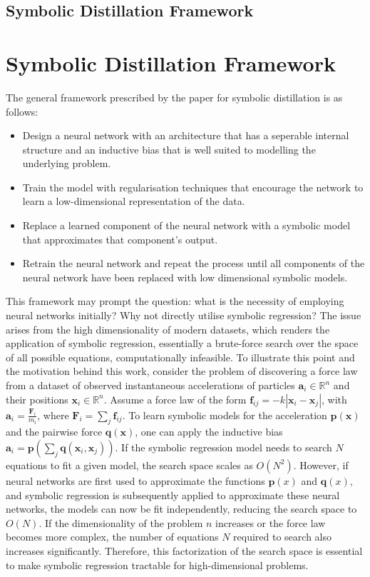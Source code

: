 \documentclass[11pt]{article}
\begin{document}
\subsection{Symbolic Distillation Framework}
\section{Symbolic Distillation Framework}
The general framework prescribed by the paper for symbolic distillation is as follows:
\begin{itemize}
    \item Design a neural network with an architecture that has a seperable internal structure and an inductive bias that is well suited to modelling the underlying problem.
    \item Train the model with regularisation techniques that encourage the network to learn a low-dimensional representation of the data.
    \item Replace a learned component of the neural network with a symbolic model that approximates that component's output.
    \item Retrain the neural network and repeat the process until all components of the neural network have been replaced with low dimensional symbolic models.
\end{itemize}

This framework may prompt the question: what is the necessity of employing neural networks initially? Why not directly utilise symbolic regression? The issue arises from the high dimensionality of modern datasets, which renders the application of symbolic regression, essentially a brute-force search over the space of all possible equations, computationally infeasible. To illustrate this point and the motivation behind this work, consider the problem of discovering a force law from a dataset of observed instantaneous accelerations of particles $\mathbf{a}_i \in \mathbb{R}^n$ and their positions $\mathbf{x}_i \in \mathbb{R}^n$. Assume a force law of the form $\mathbf{f}_{ij} = -k |\mathbf{x}_i - \mathbf{x}_j|$, with $\mathbf{a}_i = \frac{\mathbf{F}_i}{m_i}$, where $\mathbf{F}_i = \sum_j \mathbf{f}_{ij}$. To learn symbolic models for the acceleration $\textbf{p}(\textbf{x})$ and the pairwise force $\textbf{q}(\textbf{x})$, one can apply the inductive bias $\textbf{a}_i = \textbf{p}(\sum_j \textbf{q}(\textbf{x}_i, \textbf{x}_j))$. If the symbolic regression model needs to search $N$ equations to fit a given model, the search space scales as $O(N^2)$. However, if neural networks are first used to approximate the functions $\mathbf{p}(x)$ and $\mathbf{q}(x)$, and symbolic regression is subsequently applied to approximate these neural networks, the models can now be fit independently, reducing the search space to $O(N)$. If the dimensionality of the problem $n$ increases or the force law becomes more complex, the number of equations $N$ required to search also increases significantly. Therefore, this factorization of the search space is essential to make symbolic regression tractable for high-dimensional problems.
\end{document}
